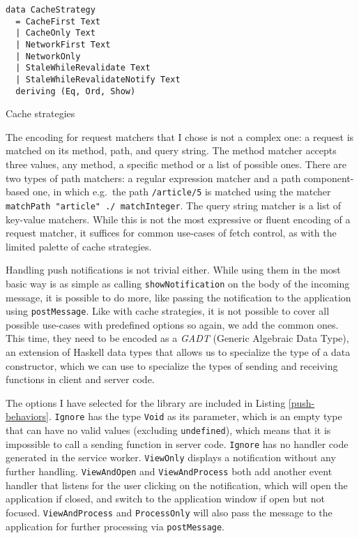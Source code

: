 \documentclass[english,odsaz]{fitthesis}
\begin{document}
\begin{listing}[htbp]
\begin{verbatim}
data CacheStrategy
  = CacheFirst Text
  | CacheOnly Text
  | NetworkFirst Text
  | NetworkOnly
  | StaleWhileRevalidate Text
  | StaleWhileRevalidateNotify Text
  deriving (Eq, Ord, Show)
\end{verbatim}
\caption{Cache strategies \label{cache-strategy}}
\end{listing}

The encoding for request matchers that I chose is not a complex one: a request
is matched on its method, path, and query string. The method matcher accepts
three values, any method, a specific method or a list of possible ones. There
are two types of path matchers: a regular expression matcher and a path
component-based one, in which e.g.~the path \texttt{/article/5} is matched using the
matcher \texttt{matchPath "article" ./ matchInteger}. The query string matcher is a list
of key-value matchers. While this is not the most expressive or fluent encoding
of a request matcher, it suffices for common use-cases of fetch control, as with
the limited palette of cache strategies.

Handling push notifications is not trivial either. While using them in the most
basic way is as simple as calling \texttt{showNotification} on the body of the incoming
message, it is possible to do more, like passing the notification to the
application using \texttt{postMessage}. Like with cache strategies, it is not possible to
cover all possible use-cases with predefined options so again, we add the common
ones. This time, they need to be encoded as a \emph{GADT} (Generic Algebraic Data Type),
an extension of Haskell data types that allows us to specialize the type of a data
constructor, which we can use to specialize the types of sending and receiving
functions in client and server code.

The options I have selected for the library are included in Listing
\ref{push-behaviors}. \texttt{Ignore} has the type \texttt{Void} as its parameter, which is an empty
type that can have no valid values (excluding \texttt{undefined}), which means that it is
impossible to call a sending function in server code. \texttt{Ignore} has no handler code
generated in the service worker. \texttt{ViewOnly} displays a notification without any
further handling. \texttt{ViewAndOpen} and \texttt{ViewAndProcess} both add another event handler
that listens for the user clicking on the notification, which will open the
application if closed, and switch to the application window if open but not
focused. \texttt{ViewAndProcess} and \texttt{ProcessOnly} will also pass the message to the
application for further processing via \texttt{postMessage}.
\end{document}
